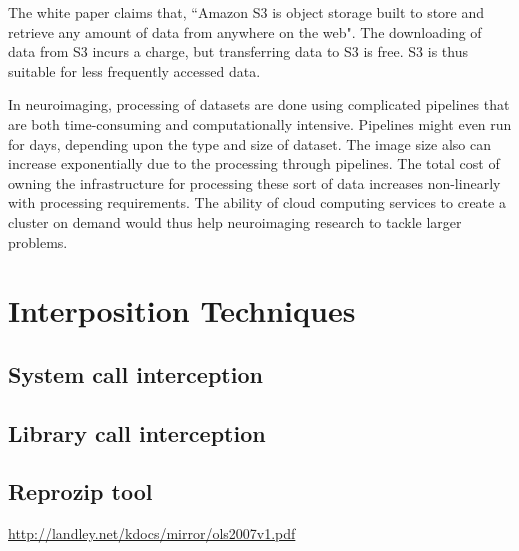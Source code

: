 The white paper \cite{Amazon-Web-Services} claims that, ``Amazon S3 is object storage built to store and retrieve any amount of data from anywhere on the web". The downloading of data from S3 incurs a charge, but transferring data to S3 is free. S3 is thus suitable for less frequently accessed data.

In neuroimaging, processing of datasets are done using complicated pipelines that are both time-consuming and computationally intensive. Pipelines might even run for days, depending upon the type and size of dataset. The image size also can increase exponentially due to the processing through pipelines. The total cost of owning the infrastructure for processing these sort of data increases non-linearly with processing requirements. The ability of cloud computing services to create a cluster on demand would thus help neuroimaging research to tackle larger problems.

\section{Interposition Techniques}
\subsection{System call interception}
\subsection{Library call interception}
\subsection{Reprozip tool}
\hyperref[System Call Interception]{http://landley.net/kdocs/mirror/ols2007v1.pdf}

